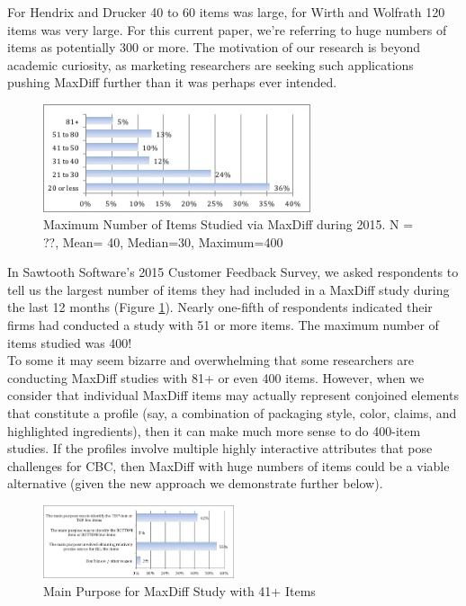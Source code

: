 \documentclass[nonblindrev]{informs3}
\begin{document}
For Hendrix and Drucker 40 to 60 items was large, for Wirth and Wolfrath 120 items was very large.  For this current paper, we're referring to huge numbers of items as potentially 300 or more. The motivation of our research is beyond academic curiosity, as marketing researchers are seeking such applications pushing MaxDiff further than it was perhaps ever intended. \\
\begin{figure}
\caption{Maximum Number of Items Studied via MaxDiff during 2015. N = ??, Mean= 40, Median=30, Maximum=400}
\label{fig:max}
\begin{center} 
\includegraphics[width=0.7\textwidth]{plots/maxnumstudy}
\end{center}
\end{figure}
In Sawtooth Software's 2015 Customer Feedback Survey, we asked respondents to tell us the largest number of items they had included in a MaxDiff study during the last 12 months (Figure \ref{fig:max}). Nearly one-fifth of respondents indicated their firms had conducted a study with 51 or more items.  The maximum number of items studied was 400!\\
To some it may seem bizarre and overwhelming that some researchers are conducting MaxDiff studies with 81+ or even 400 items.  However, when we consider that individual MaxDiff items may actually represent conjoined elements that constitute a profile (say, a combination of packaging style, color, claims, and highlighted ingredients), then it can make much more sense to do 400-item studies.  If the profiles involve multiple highly interactive attributes that pose challenges for CBC, then MaxDiff with huge numbers of items could be a viable alternative (given the new approach we demonstrate further below).\\
\begin{figure}
\caption{Main Purpose for MaxDiff Study with 41+ Items} 
\label{fig:purpose}
\begin{center} \includegraphics[width=0.5\textwidth]{plots/maxdiffpurpose}
\end{center}
\end{figure}
\end{document}
